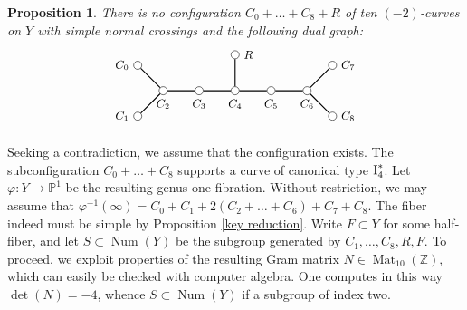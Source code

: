 \documentclass[oneside, 12pt]{amsart}
\newcommand\mylabel[1]{\label{#1}\marginpar{\vspace{-1ex}\medskip\medskip\footnotesize \tt #1}}
\renewcommand\mylabel[1]{\label{#1}}
\newtheorem{proposition}[theorem]{Proposition}
\theoremstyle{definition}
\theoremstyle{remark}
\newcommand{\ZZ}{\mathbb{Z}}
\newcommand{\PP}{\mathbb{P}}
\newcommand{\I}{\text{\rm I}}
\newcommand{\Mat}{\operatorname{Mat}}
\newcommand{\Num}{\operatorname{Num}}
\newcommand{\ra}{\rightarrow}
\begin{document}
\begin{proposition}
\mylabel{no I4*+R}
There is no configuration $C_0+\ldots+C_8+R$ of ten $(-2)$-curves on $Y$ with simple normal crossings and the following dual graph:
\begin{equation}
\label{I4*+R}
\begin{gathered}
\begin{tikzpicture}
[node distance=1cm, font=\small]

\tikzstyle{vertex}=[circle, draw, fill=white, inner sep=0mm, minimum size=1.5ex]
\node[vertex]	(C2)  	at (1,0) 	[label=below:{$C_2$}] 		{};
\node[vertex]	(C3)			[right of=C2, label=below:{$C_3$}]	{};
\node[vertex]	(C4)			[right of=C3, label=below:{$C_4$}]	{};
\node[vertex]	(C5)			[right of=C4, label=below:{$C_5$}]	{};
\node[vertex]	(C6)			[right of=C5, label=below:{$C_6$}]	{};

\node[vertex]	(C7)			[above right of=C6, label=right:{$C_7$}]	{};
\node[vertex]	(C8)			[below right of=C6, label=right:{$C_8$}]	{};
\node[vertex]	(C0)			[above left  of=C2, label=left :{$C_0$}]	{};
\node[vertex]	(C1)			[below left  of=C2, label=left :{$C_1$}]	{};
\node[vertex]	(R)			[above of=C4, label=right :{$R$}]	{};

\draw [thick] (C2)--(C3)--(C4)--(C5)--(C6);
\draw [thick] (C0)--(C2)--(C1);
\draw [thick] (C7)--(C6)--(C8);
\draw [thick] (C4)--(R);
\end{tikzpicture}
\end{gathered}
\end{equation}
\end{proposition}

\proof
Seeking a contradiction, we assume that the configuration  exists. 
The subconfiguration  $C_0+\ldots+C_8$ supports a curve of canonical type $\I_4^*$. Let $\varphi:Y\ra\PP^1$ be the resulting
genus-one fibration.  Without restriction, we may assume that 
$\varphi^{-1}(\infty) = C_0+C_1+2(C_2+\ldots+C_6)+C_7+C_8$.
The fiber   indeed must be simple by Proposition \ref{key reduction}. Write $F\subset Y$ for some half-fiber, and let 
$S\subset\Num(Y)$ be the subgroup generated by $C_1,\ldots,C_8,R,F$.
To proceed, we exploit properties of the resulting Gram matrix $N\in\Mat_{10}(\ZZ)$, which can easily be checked
with computer algebra.
One computes in this way $\det(N)=-4$, whence $S\subset \Num(Y)$ if a subgroup of index two.
% 
% 
% 
% 
\end{document}
